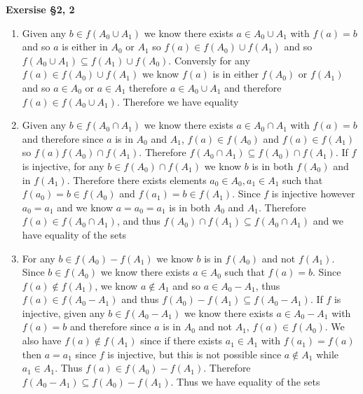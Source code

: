 \documentclass[12pt]{article}
\newenvironment{ques}[1]{\textbf{Exersise #1}\vspace{1 mm}\\ }{\bigskip}
\theoremstyle{definition}
\begin{document}
\begin{ques}{\S 2, 2}
\begin{enumerate}
		\item
			Given any $b \in f(A_0 \cup A_1)$ we know there exists
			$a \in A_0 \cup A_1$ with $f(a) = b$ and so $a$ is
			either in $A_0$ or $A_1$ so $f(a) \in f(A_0) \cup
			f(A_1)$ and so $f(A_0 \cup A_1) \subseteq f(A_1) \cup
			f(A_0)$.  Conversly for any $f(a) \in f(A_0) \cup
			f(A_1)$ we know $f(a)$ is in either $f(A_0)$ or
			$f(A_1)$ and so $a \in A_0$ or $a \in A_1$ therefore $a
			\in A_0 \cup A_1$ and therefore $f(a) \in f(A_0 \cup
			A_1)$. Therefore we have equality
		\item
			Given any $b \in f(A_0 \cap A_1)$ we know there exists
			$a \in A_0 \cap A_1$ with $f(a) = b$ and therefore
			since $a$ is in $A_0$ and $A_1$, $f(a) \in f(A_0)$ and
			$f(a) \in f(A_1)$ so $f(a) f(A_0) \cap f(A_1)$.
			Therefore $f(A_0 \cap A_1) \subseteq f(A_0) \cap
			f(A_1)$. If $f$ is injective, for any $b \in f(A_0)
			\cap f(A_1)$ we know $b$ is in both $f(A_0)$ and in
			$f(A_1)$. Therefore there exists elements $a_0 \in A_0,
			a_1 \in A_1$ such that $f(a_0) = b \in f(A_0)$ and
			$f(a_1) = b \in f(A_1)$. Since $f$ is injective however
			$a_0 = a_1$ and we know $a = a_0 = a_1$ is in both
			$A_0$ and $A_1$. Therefore $f(a) \in f(A_0 \cap A_1)$,
			and thus $f(A_0) \cap f(A_1) \subseteq f(A_0 \cap A_1)$
			and we have equality of the sets

		\item
			 For any $b \in f(A_0) - f(A_1)$ we know $b$ is in
			 $f(A_0)$ and not $f(A_1)$. Since $b \in f(A_0)$ we
			 know there exists $a \in A_0$ such that $f(a) = b$.
			 Since $f(a) \notin f(A_1)$, we know $a \notin A_1$ and
			 so $a \in A_0 - A_1$, thus $f(a) \in f(A_0 - A_1)$ and
			 thus $f(A_0) - f(A_1) \subseteq f(A_0 - A_1)$. If $f$
			 is injective, given any $b \in f(A_0 - A_1)$ we know
			 there exists $a \in A_0 - A_1$ with $f(a) = b$ and
			 therefore since $a$ is in $A_0$ and not $A_1$, $f(a)
			 \in f(A_0)$. We also have $f(a) \notin f(A_1)$ since
			 if there exists $a_1 \in A_1$ with $f(a_1) = f(a)$
			 then $a = a_1$ since $f$ is injective, but this is not
			 possible since $a \notin A_1$ while $a_1 \in A_1$.
			 Thus $f(a) \in f(A_0) - f(A_1)$.  Therefore $f(A_0 -
			 A_1) \subseteq f(A_0) - f(A_1)$. Thus we have equality
			 of the sets

	\end{enumerate}
\end{ques}
\end{document}
